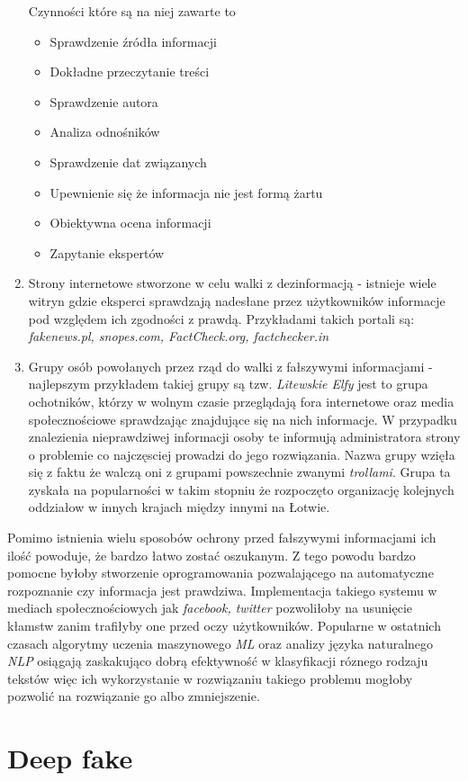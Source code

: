 \begin{enumerate}
    Czynności które są na niej zawarte to 
    \begin{itemize}
        \item Sprawdzenie źródła informacji
        \item Dokładne przeczytanie treści
        \item Sprawdzenie autora
        \item Analiza odnośników 
        \item Sprawdzenie dat związanych 
        \item Upewnienie się że informacja nie jest formą żartu
        \item Obiektywna ocena informacji
        \item Zapytanie ekspertów
    \end{itemize}
    \item Strony internetowe stworzone w celu walki z dezinformacją - istnieje
    wiele witryn gdzie eksperci sprawdzają nadesłane przez użytkowników informacje
    pod względem ich zgodności z prawdą.
    Przykładami takich portali są: \emph{fakenews.pl, snopes.com, FactCheck.org, factchecker.in} 
    \item Grupy osób powołanych przez rząd do walki z fałszywymi informacjami - najlepszym przykładem
    takiej grupy są tzw. \emph{Litewskie Elfy} jest to grupa ochotników, którzy w wolnym czasie przeglądają 
    fora internetowe oraz media społecznościowe sprawdzając znajdujące się na nich informacje. W przypadku
    znalezienia nieprawdziwej informacji osoby te informują administratora strony o problemie co najczęsciej
    prowadzi do jego rozwiązania. Nazwa grupy wzięła się z faktu że walczą oni z 
    grupami powszechnie zwanymi \emph{trollami}. Grupa ta zyskała na popularności
    w takim stopniu że rozpoczęto organizację kolejnych oddziałow w innych krajach
    między innymi na Łotwie.~\cite{Elves}
\end{enumerate}
Pomimo istnienia wielu sposobów ochrony przed fałszywymi informacjami ich ilość powoduje,
że bardzo łatwo zostać oszukanym. Z tego powodu bardzo pomocne byłoby stworzenie oprogramowania
pozwalającego na automatyczne rozpoznanie czy informacja jest prawdziwa.
Implementacja takiego systemu w mediach społecznościowych jak \emph{facebook, twitter} pozwoliłoby na usunięcie 
kłamstw zanim trafiłyby one przed oczy użytkowników. Popularne w ostatnich czasach algorytmy uczenia
maszynowego \emph{ML} oraz analizy języka naturalnego \emph{NLP} osiągają zaskakująco dobrą 
efektywność w klasyfikacji róznego rodzaju tekstów więc ich wykorzystanie w rozwiązaniu takiego 
problemu mogłoby pozwolić na rozwiązanie go albo zmniejszenie.

\section{Deep fake}
